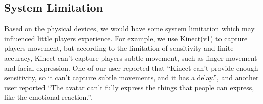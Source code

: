 \subsection{System Limitation}
	Based on the physical devices, we would have some system limitation which may influenced little players experience. For example, we use Kinect(v1) to capture players movement, but according to the limitation of sensitivity and finite accuracy, Kinect can't capture players subtle movement, such as finger movement and facial expression. One of our user reported that ``Kinect can't provide enough sensitivity, so it can't capture subtle movements, and it has a delay.'', and 
	another user reported ``The avatar can't fully express the things that people can express, like the emotional reaction.''.





